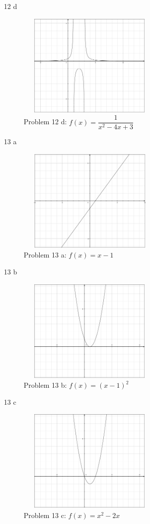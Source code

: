 \documentclass[fleqn,addpoints]{exam}
\begin{document}
\begin{itemize}
\item[12 d]
\begin{figure}[H]
  \centering
  \includegraphics[width=7cm,height=5cm]{p82-12d.eps}
  \caption*{Problem 12 d: $f(x) = \dfrac{1}{x^2-4x+3}$}
\end{figure}

\item[13 a]
\begin{figure}[H]
  \centering
  \includegraphics[width=7cm,height=5cm]{p82-13a.eps}
  \caption*{Problem 13 a: $f(x) = x-1$}
\end{figure}

\item[13 b]
\begin{figure}[H]
  \centering
  \includegraphics[width=7cm,height=5cm]{p82-13b.eps}
  \caption*{Problem 13 b: $f(x) = (x-1)^2$}
\end{figure}

\item[13 c]
\begin{figure}[H]
  \centering
  \includegraphics[width=7cm,height=5cm]{p82-13c.eps}
  \caption*{Problem 13 c: $f(x) = x^2 - 2x$}
\end{figure}


\end{itemize}
\end{document}
